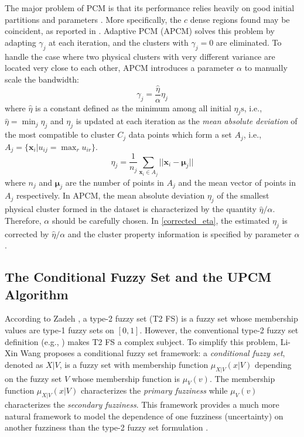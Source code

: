 \documentclass[conference]{IEEEtran}
\theoremstyle{definition}
\begin{document}
The major problem of PCM is that its performance relies heavily on good initial partitions and parameters \cite{nasraoui_improved_1996}. More specifically, the $c$ dense regions found may be coincident, as reported in \cite{barni_comments_1996}. Adaptive PCM (APCM) \cite{xenaki_novel_2016} solves this problem by adapting $\gamma_j$ at each iteration, and the clusters with $\gamma_j=0$ are eliminated. To handle the case where two physical clusters with very different variance are located very close to each other, APCM introduces a parameter $\alpha$ to manually scale the bandwidth:
\begin{equation}
\label{corrected_eta}
\gamma_j=\frac{\hat{\eta}}{\alpha}\eta_j
\end{equation}
where $\hat{\eta}$ is a constant defined as the minimum among all initial $\eta_j\text{s}$, i.e., $\hat{\eta}=\min_j\eta_j$ and
$\eta_j$ is updated at each iteration as the \emph{mean absolute deviation} of the most compatible to cluster $C_j$ data points which form a set $A_j$, i.e., $A_j=\{\mathbf{x}_i|u_{ij}=\max_r u_{ir}\}$.
\begin{equation}
\label{apcm_eta_update}
\eta_j=\frac{1}{n_j}\sum_{\mathbf{x}_i\in A_j}||\mathbf{x}_i-\boldsymbol{\mu}_j||
\end{equation}
where $n_j$ and $\boldsymbol{\mu}_j$ are the number of points in $A_j$ and the mean vector of points in $A_j$ respectively.
In APCM, the mean absolute deviation $\eta_j$ of the smallest physical cluster formed in the dataset is characterized by the quantity $\hat{\eta}/\alpha$. Therefore, $\alpha$ should be carefully chosen. In \eqref{corrected_eta}, the estimated $\eta_j$ is corrected by $\hat{\eta}/\alpha$ and the cluster property information is specified by parameter $\alpha$.
\subsection{The Conditional Fuzzy Set and the UPCM Algorithm}
\label{sec-2-2}
According to Zadeh \cite{zadeh_concept_1975}, a type-2 fuzzy set (T2 FS) is a fuzzy set whose membership values are type-1 fuzzy sets on $[0,1]$. However, the conventional type-2 fuzzy set definition (e.g., \cite{mendel_type-2_2002}) makes T2 FS a complex subject. To simplify this problem, Li-Xin Wang \cite{wang_new_2016} proposes a conditional fuzzy set framework: a \emph{conditional fuzzy set}, denoted as $X|V$, is a fuzzy set with membership function $\mu_{X|V}(x|V)$ depending on the fuzzy set $V$ whose membership function is $\mu_V(v)$. The membership function $\mu_{X|V}(x|V)$ characterizes the \emph{primary fuzziness} while $\mu_V(v)$ characterizes the \emph{secondary fuzziness}. This framework provides a much more natural framework to model the dependence of one fuzziness (uncertainty) on another fuzziness than the type-2 fuzzy set formulation \cite{wang_new_2016}.
\end{document}
